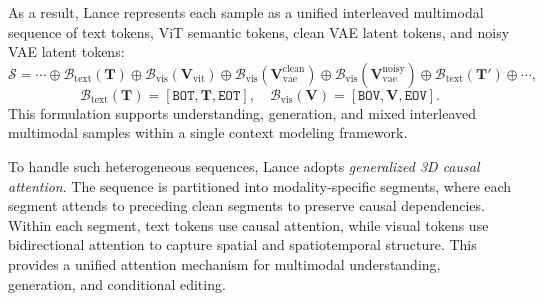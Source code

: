 As a result, Lance represents each sample as a unified interleaved multimodal sequence of text tokens, ViT semantic tokens, clean VAE latent tokens, and noisy VAE latent tokens:
\begin{equation}
\mathcal{S}
=
\cdots \oplus
\mathcal{B}_{\mathrm{text}}(\mathbf{T})
\oplus
\mathcal{B}_{\mathrm{vis}}(\mathbf{V}_{\mathrm{vit}})
\oplus
\mathcal{B}_{\mathrm{vis}}(\mathbf{V}_{\mathrm{vae}}^{\mathrm{clean}})
\oplus
\mathcal{B}_{\mathrm{vis}}(\mathbf{V}_{\mathrm{vae}}^{\mathrm{noisy}})
\oplus
\mathcal{B}_{\mathrm{text}}(\mathbf{T}')
\oplus \cdots ,
\end{equation}
\begin{equation}
\mathcal{B}_{\mathrm{text}}(\mathbf{T})
=
[\texttt{BOT}, \mathbf{T}, \texttt{EOT}],
\quad
\mathcal{B}_{\mathrm{vis}}(\mathbf{V})
=
[\texttt{BOV}, \mathbf{V}, \texttt{EOV}].
\end{equation}
This formulation supports understanding, generation, and mixed interleaved multimodal samples within a single context modeling framework.


To handle such heterogeneous sequences, Lance adopts \textit{generalized 3D causal attention}. The sequence is partitioned into modality-specific segments, where each segment attends to preceding clean segments to preserve causal dependencies. Within each segment, text tokens use causal attention, while visual tokens use bidirectional attention to capture spatial and spatiotemporal structure. This provides a unified attention mechanism for multimodal understanding, generation, and conditional editing.

